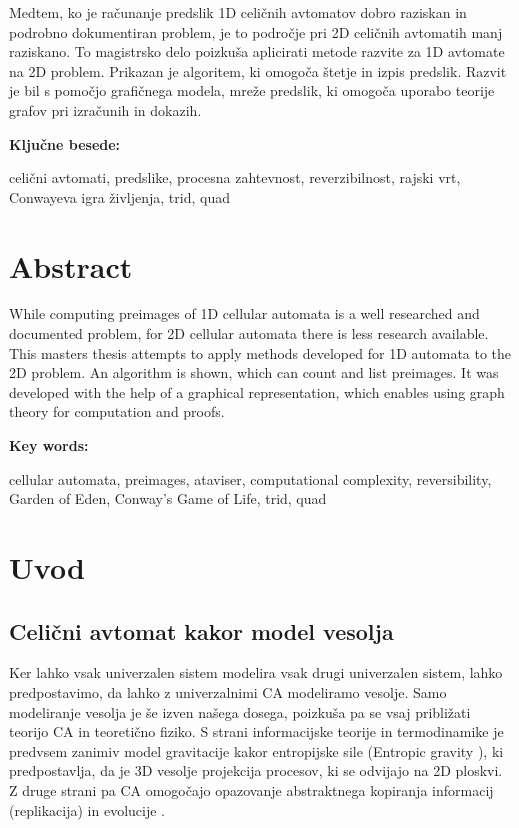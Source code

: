 \documentclass[12pt,a4paper,openany,twoside]{book}
\begin{document}

Medtem, ko je računanje predslik 1D celičnih avtomatov dobro raziskan in
podrobno dokumentiran problem, je to področje pri 2D celičnih avtomatih manj
raziskano. To magistrsko delo poizkuša aplicirati metode razvite za 1D avtomate
na 2D problem. Prikazan je algoritem, ki omogoča štetje in izpis predslik.
Razvit je bil s pomočjo grafičnega modela, mreže predslik, 
ki omogoča uporabo teorije grafov pri izračunih in dokazih.

\vspace{1.3cm}
\noindent
{\large \bf Ključne besede:}

\vspace{0.5cm}
\noindent
celični avtomati, predslike, procesna zahtevnost, reverzibilnost, rajski vrt, Conwayeva igra življenja, trid, quad


\chapter*{Abstract}


While computing preimages of 1D cellular automata is a well researched and
documented problem, for 2D cellular automata there is less research available.
This masters thesis attempts to apply methods developed for 1D automata to the
2D problem. An algorithm is shown, which can count and list preimages.
It was developed with the help of a graphical representation, which enables using graph theory for computation and proofs.

\vspace{1.3cm}
\noindent
{\large \bf Key words:}

\vspace{0.5cm}
\noindent
cellular automata, preimages, ataviser, computational complexity, reversibility, Garden of Eden, Conway's Game of Life, trid, quad



\chapter{Uvod}

\section{Celični avtomat kakor model vesolja}

Ker lahko vsak univerzalen sistem modelira vsak drugi univerzalen sistem, lahko predpostavimo,
da lahko z univerzalnimi CA modeliramo vesolje. Samo modeliranje vesolja
je še izven našega dosega, poizkuša pa se vsaj približati teorijo CA in teoretično fiziko.
S strani informacijske teorije in termodinamike je predvsem zanimiv model gravitacije
kakor entropijske sile (Entropic gravity \cite{Verlinde2010}), ki predpostavlja, da je
3D vesolje projekcija procesov, ki se odvijajo na 2D ploskvi. Z druge strani pa CA omogočajo
opazovanje abstraktnega kopiranja informacij (replikacija) in evolucije \cite{Salzberg2004}.
\end{document}

